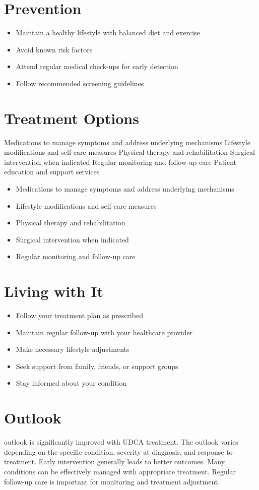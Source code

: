 \section{Prevention}
\begin{itemize}[noitemsep]
  \item Maintain a healthy lifestyle with balanced diet and exercise
  \item Avoid known risk factors
  \item Attend regular medical check-ups for early detection
  \item Follow recommended screening guidelines
\end{itemize}
\section{Treatment Options}
Medications to manage symptoms and address underlying mechanisms Lifestyle modifications and self-care measures Physical therapy and rehabilitation Surgical intervention when indicated Regular monitoring and follow-up care Patient education and support services

\begin{itemize}[noitemsep]
  \item Medications to manage symptoms and address underlying mechanisms
  \item Lifestyle modifications and self-care measures
  \item Physical therapy and rehabilitation
  \item Surgical intervention when indicated
  \item Regular monitoring and follow-up care
\end{itemize}
\section{Living with It}
\begin{itemize}[noitemsep]
  \item Follow your treatment plan as prescribed
  \item Maintain regular follow-up with your healthcare provider
  \item Make necessary lifestyle adjustments
  \item Seek support from family, friends, or support groups
  \item Stay informed about your condition
\end{itemize}
\section{Outlook}
outlook is significantly improved with UDCA treatment. The outlook varies depending on the specific condition, severity at diagnosis, and response to treatment. Early intervention generally leads to better outcomes. Many conditions can be effectively managed with appropriate treatment. Regular follow-up care is important for monitoring and treatment adjustment.
